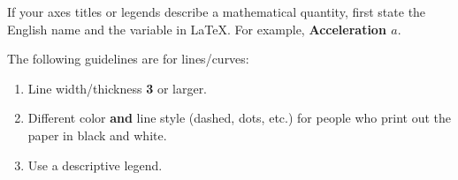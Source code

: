 If your axes titles or legends describe a mathematical quantity, first state the English name and the variable in LaTeX. For example, \textbf{Acceleration $a$}.

The following guidelines are for lines/curves:

\begin{enumerate}
    \item Line width/thickness \textbf{3} or larger.
    \item Different color \textbf{and} line style (dashed, dots, etc.) for people who print out the paper in black and white.
    \item Use a descriptive legend.
\end{enumerate}


